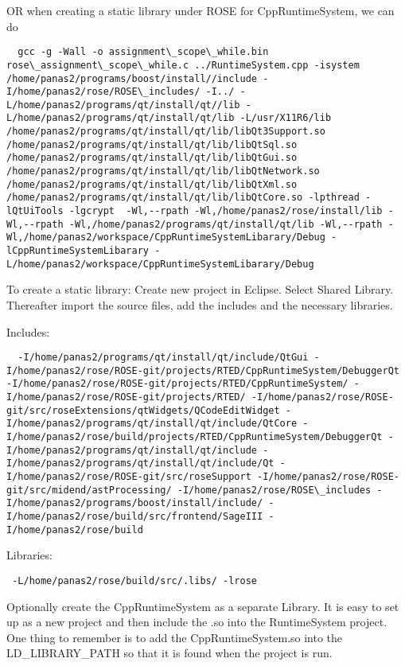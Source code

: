 OR when creating a static library under ROSE for CppRuntimeSystem, we can do

\begin{verbatim}
  gcc -g -Wall -o assignment\_scope\_while.bin rose\_assignment\_scope\_while.c ../RuntimeSystem.cpp -isystem /home/panas2/programs/boost/install//include -I/home/panas2/rose/ROSE\_includes/ -I../ -L/home/panas2/programs/qt/install/qt//lib -L/home/panas2/programs/qt/install/qt/lib -L/usr/X11R6/lib /home/panas2/programs/qt/install/qt/lib/libQt3Support.so /home/panas2/programs/qt/install/qt/lib/libQtSql.so /home/panas2/programs/qt/install/qt/lib/libQtGui.so /home/panas2/programs/qt/install/qt/lib/libQtNetwork.so /home/panas2/programs/qt/install/qt/lib/libQtXml.so /home/panas2/programs/qt/install/qt/lib/libQtCore.so -lpthread -lQtUiTools -lgcrypt  -Wl,--rpath -Wl,/home/panas2/rose/install/lib -Wl,--rpath -Wl,/home/panas2/programs/qt/install/qt/lib -Wl,--rpath -Wl,/home/panas2/workspace/CppRuntimeSystemLibarary/Debug -lCppRuntimeSystemLibarary -L/home/panas2/workspace/CppRuntimeSystemLibarary/Debug
\end{verbatim}

To create a static library: Create new project in Eclipse. Select Shared Library. Thereafter import the source files, add the includes and the necessary libraries.

Includes:

\begin{verbatim}
  -I/home/panas2/programs/qt/install/qt/include/QtGui -I/home/panas2/rose/ROSE-git/projects/RTED/CppRuntimeSystem/DebuggerQt -I/home/panas2/rose/ROSE-git/projects/RTED/CppRuntimeSystem/ -I/home/panas2/rose/ROSE-git/projects/RTED/ -I/home/panas2/rose/ROSE-git/src/roseExtensions/qtWidgets/QCodeEditWidget -I/home/panas2/programs/qt/install/qt/include/QtCore -I/home/panas2/rose/build/projects/RTED/CppRuntimeSystem/DebuggerQt -I/home/panas2/programs/qt/install/qt/include -I/home/panas2/programs/qt/install/qt/include/Qt -I/home/panas2/rose/ROSE-git/src/roseSupport -I/home/panas2/rose/ROSE-git/src/midend/astProcessing/ -I/home/panas2/rose/ROSE\_includes -I/home/panas2/programs/boost/install/include/ -I/home/panas2/rose/build/src/frontend/SageIII -I/home/panas2/rose/build
\end{verbatim}

Libraries:

\begin{verbatim}
 -L/home/panas2/rose/build/src/.libs/ -lrose
\end{verbatim}

Optionally create the CppRuntimeSystem as a separate Library. It is easy to set up as a new project and then include the .so into the RuntimeSystem project. One thing to remember is to add the CppRuntimeSystem.so into the LD\_LIBRARY\_PATH so that it is found when the project is run.


